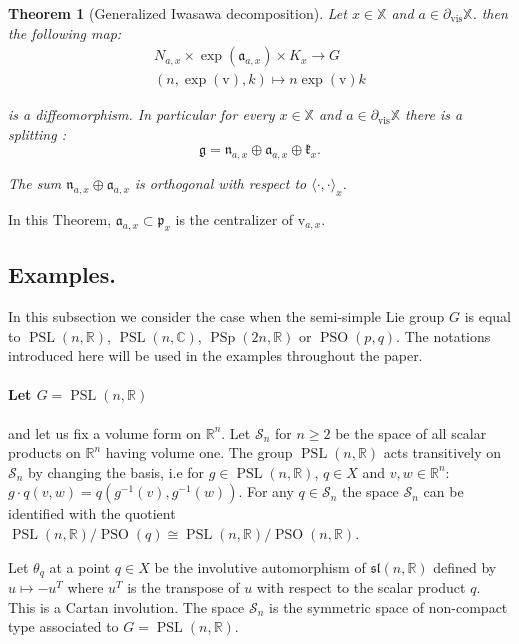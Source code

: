 \documentclass[reqno,10pt]{amsart}
\theoremstyle{plain}
\newtheorem{thm}{Theorem}[section]
\theoremstyle{definition}
\theoremstyle{remark}
\newcommand{\R}{\mathbb{R}}
\newcommand{\C}{\mathbb{C}}
\newcommand{\transpose}[1]{\ensuremath{#1^{\scriptscriptstyle T}}}
\DeclareMathOperator{\vis}{vis}
\DeclareMathOperator{\PSL}{PSL}
\DeclareMathOperator{\PSO}{PSO}
\DeclareMathOperator{\PSp}{PSp}
\newcommand{\X}{\mathbb{X}}
\begin{document}
\begin{thm}[Generalized Iwasawa decomposition]
Let $x\in \X$ and $a\in \partial_{\vis}\X$. then the following map:
\begin{align*}
 N_{a,x}\times \exp(\mathfrak{a}_{a,x})\times K_x\longrightarrow G \\
 (n,\exp(\mathrm{v}),k)\longmapsto n\exp(\mathrm{v})k
\end{align*}
 
is a diffeomorphism. In particular for every $x\in \X$ and $a\in \partial_{\vis}\X$ there is a splitting :
 $$\mathfrak{g}=\mathfrak{n}_{a,x}\oplus \mathfrak{a}_{a,x}\oplus \mathfrak{k}_{x}.$$

The sum $\mathfrak{n}_{a,x}\oplus \mathfrak{a}_{a,x}$ is orthogonal with respect to $\langle\cdot,\cdot\rangle_x$.
\end{thm}

In this Theorem, $\mathfrak{a}_{a,x}\subset \mathfrak{p}_x$ is the centralizer of $\mathrm{v}_{a,x}$.

\subsection{Examples.}
\label{subsec:ExamplesRoots}
In this subsection we consider the case when the semi-simple Lie group $G$ is equal to $\PSL(n,\R)$, $\PSL(n,\C)$, $\PSp(2n,\R)$ or $\PSO(p,q)$. The notations introduced here will be used in the examples throughout the paper.

\medskip

\paragraph*{Let $G=\PSL(n,\R)$} and let us fix a volume form on $\R^n$. Let $\mathcal{S}_n$ for $n\geq 2$ be the space of all scalar products on $\R^n$ having volume one.  The group $\PSL(n,\R)$ acts  transitively on $\mathcal{S}_n$ by changing the basis, i.e for $g\in \PSL(n,\R)$, $q\in X$ and $v,w\in \R^n$: $g\cdot q(v,w)=q(g^{-1}(v),g^{-1}(w))$. For any $q\in \mathcal{S}_n$ the space $\mathcal{S}_n$ can be identified with the quotient $\PSL(n,\mathbb{R})/\PSO(q)\cong \PSL(n,\mathbb{R})/\PSO(n,\mathbb{R})$.

\smallskip

Let $\theta_q$ at a point $q\in X$  be the involutive automorphism of $\mathfrak{sl}(n,\R)$ defined by $u\mapsto -\transpose{u}$ where $\transpose{u}$ is the transpose of $u$ with respect to the scalar product $q$. This is a Cartan involution. The space $\mathcal{S}_n$ is the symmetric space of non-compact type associated to $G=\PSL(n,\R)$. 
\end{document}
